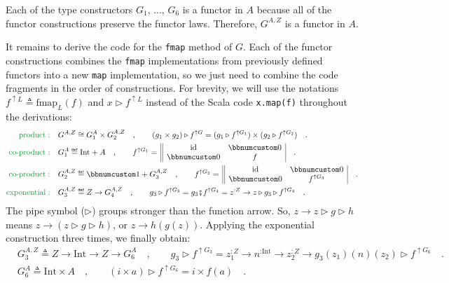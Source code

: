 Each of the type constructors $G_{1}$, ..., $G_{6}$ is a functor
in $A$ because all of the functor constructions preserve the functor
laws. Therefore, $G^{A,Z}$ is a functor in $A$. 

It remains to derive the code for the \lstinline!fmap! method of
$G$. Each of the functor constructions combines the \lstinline!fmap!
implementations from previously defined functors into a new \lstinline!map!
implementation, so we just need to combine the code fragments in the
order of constructions. For brevity, we will use the notations $f^{\uparrow L}\triangleq\text{fmap}_{L}(f)$
and $x\triangleright f^{\uparrow L}$ instead of the Scala code \lstinline!x.map(f)!
throughout the derivations:
\begin{align*}
{\color{greenunder}\text{product}:}\quad & G^{A,Z}\cong G_{1}^{A}\times G_{2}^{A,Z}\quad,\quad\quad(g_{1}\times g_{2})\triangleright f^{\uparrow G}=(g_{1}\triangleright f^{\uparrow G_{1}})\times(g_{2}\triangleright f^{\uparrow G_{2}})\quad.\\
{\color{greenunder}\text{co-product}:}\quad & G_{1}^{A}\triangleq\text{Int}+A\quad,\quad\quad f^{\uparrow G_{1}}=\,\begin{array}{||cc|}
\text{id} & \bbnum 0\\
\bbnum 0 & f
\end{array}\quad.\\
{\color{greenunder}\text{co-product}:}\quad & G_{2}^{A,Z}\triangleq\bbnum 1+G_{3}^{A,Z}\quad,\quad\quad f^{\uparrow G_{2}}=\,\begin{array}{||cc|}
\text{id} & \bbnum 0\\
\bbnum 0 & f^{\uparrow G_{3}}
\end{array}\quad.\\
{\color{greenunder}\text{exponential}:}\quad & G_{3}^{A,Z}\triangleq Z\rightarrow G_{4}^{A,Z}\quad,\quad\quad g_{3}\triangleright f^{\uparrow G_{3}}=g_{3}\bef f^{\uparrow G_{4}}=z^{:Z}\rightarrow z\triangleright g_{3}\triangleright f^{\uparrow G_{4}}\quad.
\end{align*}
The pipe symbol ($\triangleright$) groups stronger than the function
arrow. So, $z\rightarrow z\triangleright g\triangleright h$
means $z\rightarrow(z\triangleright g\triangleright h)$, or $z\rightarrow h(g(z))$.
Applying the exponential  construction three times, we finally obtain:
\begin{align*}
 & G_{3}^{A,Z}\triangleq Z\rightarrow\text{Int}\rightarrow Z\rightarrow G_{6}^{A}\quad,\quad\quad g_{3}\triangleright f^{\uparrow G_{3}}=z_{1}^{:Z}\rightarrow n^{:\text{Int}}\rightarrow z_{2}^{:Z}\rightarrow g_{3}(z_{1})(n)(z_{2})\triangleright f^{\uparrow G_{6}}\quad.\\
 & G_{6}^{A}\triangleq\text{Int}\times A\quad,\quad\quad(i\times a)\triangleright f^{\uparrow G_{6}}=i\times f(a)\quad.
\end{align*}
